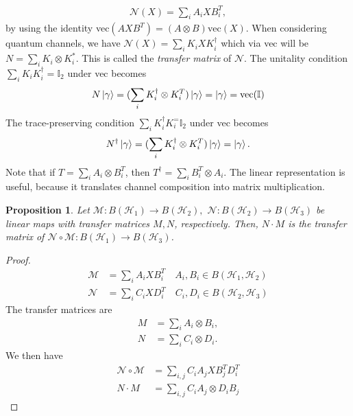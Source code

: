 \documentclass[10pt,oneside,longbibliography]{report}
\newtheorem{proposition}{Proposition}[section]
\begin{document}
\begin{align}
    \mathcal{N}(X) = \sum_i A_i X B_i^T,
\end{align}
by using the identity vec$(A X B^T)=(A\otimes B)\text{vec}(X)$. When considering quantum channels, we have
$\mathcal{N}(X) = \sum_i K_i X K_i^{\dagger}$ which via vec will be $N=\sum_i K_i \otimes K_i^{*}$. This is called the \textit{transfer matrix} of $\mathcal{N}$. The unitality condition $\sum_i K_i K_i^{\dagger}=\mathbb{I}_2$ under vec becomes 
\begin{align}
    N\ket{\gamma} = (\sum_i K_i^{\dagger} \otimes K_i^T)\ket{\gamma}= \ket{\gamma}=\text{vec}(\mathbb{I})
\end{align}
The trace-preserving condition $\sum_i K_i^{\dagger} K_i^=\mathbb{I}_2$ under vec becomes 
\begin{align}
    N^{\dagger}\ket{\gamma}=(\sum_i K_i^{\dagger} \otimes K_i^{T})\ket{\gamma} = \ket{\gamma}.
\end{align}
Note that if $T=\sum_i A_i \otimes B_i^T$, then $T^{\dagger} = \sum_i B_i^T \otimes A_i.$ The linear representation is useful, because it translates channel composition into matrix multiplication. 

\begin{proposition}
Let $\mathcal{M}: B(\mathcal{H}_1)\rightarrow B(\mathcal{H}_2), $ $\mathcal{N}: B(\mathcal{H}_2)\rightarrow B(\mathcal{H}_3)$ be linear maps with transfer matrices $M,N$, respectively. Then, $N\cdot M$ is the transfer matrix of $\mathcal{N} \circ \mathcal{M}: B(\mathcal{H}_1)\rightarrow B(\mathcal{H}_3)$. 
\end{proposition}

\begin{tcolorbox}[colframe=black,breakable, colback=black!5, arc=0pt, outer arc=0pt,boxrule=0.5pt]
\begin{proof}
\begin{align}
    \mathcal{M} &=\sum_i A_i X B_i^T \quad A_i, B_i \in B(\mathcal{H}_1,\mathcal{H}_2)\\
    \mathcal{N} &= \sum_i C_i X D_i^T \quad C_i, D_i \in B(\mathcal{H}_2,\mathcal{H}_3)
\end{align}
The transfer matrices are
\begin{align}
    M &=\sum_i A_i \otimes B_i, \\
    N &= \sum_i C_i \otimes D_i. 
\end{align}
We then have 
\begin{align}
    \mathcal{N} \circ \mathcal{M} &=\sum_{i,j} C_i A_j X B_j^T D_i^T\\
    N\cdot M &= \sum_{i,j} C_i A_j \otimes D_i B_j
\end{align}
\end{proof}
\end{tcolorbox}
\end{document}
